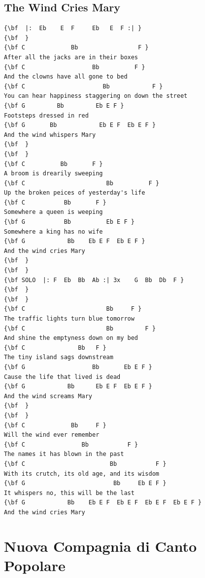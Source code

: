 \documentclass[a4paper]{article}
\begin{document}
\subsection{The Wind Cries Mary}
\begin{Verbatim}[commandchars=\\\{\}]
{\bf  |:  Eb    E  F     Eb   E  F :| }
{\bf  }
{\bf C             Bb                 F }
After all the jacks are in their boxes 
{\bf C                   Bb          F }
And the clowns have all gone to bed 
{\bf C                      Bb            F }
You can hear happiness staggering on down the street 
{\bf G         Bb         Eb E F }
Footsteps dressed in red 
{\bf G       Bb            Eb E F  Eb E F }
And the wind whispers Mary 
{\bf  }
{\bf  }
{\bf C          Bb       F }
A broom is drearily sweeping 
{\bf C                       Bb          F }
Up the broken peices of yesterday's life 
{\bf C           Bb       F }
Somewhere a queen is weeping 
{\bf G           Bb          Eb E F }
Somewhere a king has no wife 
{\bf G            Bb    Eb E F  Eb E F }
And the wind cries Mary 
{\bf  }
{\bf  }
{\bf SOLO  |: F  Eb  Bb  Ab :| 3x    G  Bb  Db  F }
{\bf  }
{\bf  }
{\bf C                       Bb     F }
The traffic lights turn blue tomorrow 
{\bf C                       Bb         F }
And shine the emptyness down on my bed 
{\bf C               Bb   F }
The tiny island sags downstream 
{\bf G                   Bb       Eb E F }
Cause the life that lived is dead 
{\bf G            Bb      Eb E F  Eb E F }
And the wind screams Mary 
{\bf  }
{\bf  }
{\bf C             Bb     F }
Will the wind ever remember 
{\bf C                Bb           F }
The names it has blown in the past 
{\bf C                        Bb           F }
With its crutch, its old age, and its wisdom 
{\bf G                         Bb     Eb E F }
It whispers no, this will be the last 
{\bf G            Bb    Eb E F  Eb E F  Eb E F  Eb E F }
And the wind cries Mary 

\end{Verbatim}
\newpage
\section{Nuova Compagnia di Canto Popolare}
\end{document}
